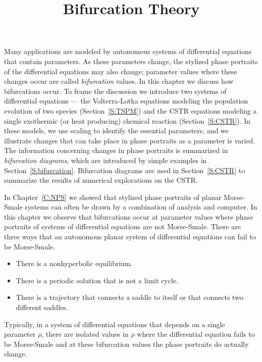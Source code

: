 \documentclass{ximera}
\title{Bifurcation Theory}
\begin{document}
\begin{abstract}
\end{abstract}
\maketitle


\label{C:BT}

\normalsize

Many applications are modeled by autonomous systems of differential 
equations that contain parameters. As these parameters
change, the stylized phase portraits of the differential
equations may also change; parameter values where these
changes occur are called {\em bifurcation\/} 
values.  In this chapter we discuss how bifurcations occur.  To frame  
the discussion we introduce two systems of differential equations --- the 
Volterra-Lotka equations modeling the population evolution of two 
species (Section~\ref{S:TSPM}) and the CSTR equations 
modeling a single exothermic (or heat producing) chemical reaction (Section~\ref{S:CSTR}).  In these models, we use scaling to identify the 
essential parameters, and we illustrate changes that can take place in 
phase portraits as a parameter is varied.  The information concerning 
changes in phase portraits is summarized in {\em bifurcation diagrams}, 
which are introduced by simple examples in Section~\ref{S:bifurcation}. 
Bifurcation diagrams are used in Section~\ref{S:CSTR} to summarize the 
results of numerical explorations on the CSTR.

In Chapter~\ref{C:NPS} we showed that stylized phase portraits of planar 
Morse-Smale  systems can often be drawn by a 
combination of analysis and computer.  In this chapter we observe that 
bifurcations occur at parameter values where phase portraits of systems of 
differential equations are not Morse-Smale.  There are three ways that an 
autonomous planar system of differential equations can fail to be 
Morse-Smale.
\begin{itemize}
\item  There is a nonhyperbolic equilibrium. 
\item  There is a periodic solution that is not a limit cycle.
\item  There is a trajectory that connects a saddle to itself or
that connects two different saddles.  
\end{itemize}
Typically, in a system of differential equations that depends on a single
parameter $\rho$, there are isolated values in $\rho$ where the 
differential equation fails to be Morse-Smale and at these bifurcation
values the phase portraits do actually change.
\end{document}
